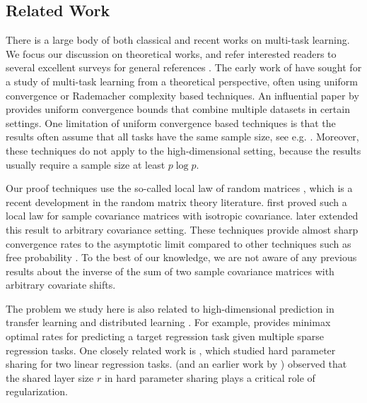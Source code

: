 

\subsection{Related Work}

There is a large body of both classical and recent works on multi-task learning.
We focus our discussion on theoretical works, and refer interested readers to several excellent surveys for general references \cite{PY09,R17,ZY17,V20}.
The early work of \citet{B00,BS03,M06} have sought for a study of multi-task learning from a theoretical perspective, often using uniform convergence or Rademacher complexity based techniques.
An influential paper by \citet{BBCK10} provides uniform convergence bounds that combine multiple datasets in certain settings.
One limitation of uniform convergence based techniques is that the results often assume that all  tasks have the same sample size, see e.g. \citet{B00,MPR16}.
Moreover, these techniques do not apply to the high-dimensional setting, because the results usually require a sample size at least $p \log p$.

Our proof techniques use the so-called local law of random matrices \cite{erdos2017dynamical}, which is a recent development in the random matrix theory literature.
\citet{isotropic} first proved such a local law for sample covariance matrices with isotropic covariance.
\citet{Anisotropic} later extended this result to arbitrary covariance setting.
These techniques provide almost sharp convergence rates to the asymptotic limit compared to other techniques such as free probability \cite{nica2006lectures}.
To the best of our knowledge, we are not aware of any previous results about the inverse of the sum of two sample covariance matrices with arbitrary covariate shifts.

The problem we study here is also related to high-dimensional prediction in transfer learning \cite{li2020transfer,bastani2020predicting} and distributed learning \cite{dobriban2018high}.
For example, \citet{li2020transfer} provides minimax optimal rates for predicting a target regression task given multiple sparse regression tasks.
One closely related work is \citet{WZR20}, which studied hard parameter sharing for two linear regression tasks.
\citet{WZR20} (and an earlier work by \citet{KD12}) observed that the shared layer size $r$ in hard parameter sharing plays a critical role of regularization.

